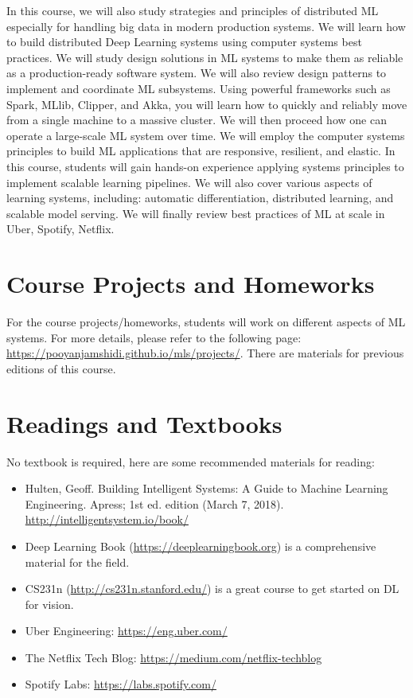 \documentclass[11pt]{article}
\begin{document}
In this course, we will also study strategies and principles of distributed ML especially for handling big data in modern production systems. We will learn how to build distributed Deep Learning systems using computer systems best practices. We will study design solutions in ML systems to make them as reliable as a production-ready software system. We will also review design patterns to implement and coordinate ML subsystems. Using powerful frameworks such as Spark, MLlib, Clipper, and Akka, you will learn how to quickly and reliably move from a single machine to a massive cluster. We will then proceed how one can operate a large-scale ML system over time. We will employ the computer systems principles to build ML applications that are responsive, resilient, and elastic. In this course, students will gain hands-on experience applying systems principles to implement scalable learning pipelines. We will also cover various aspects of learning systems, including: automatic differentiation, distributed learning, and scalable model serving. We will finally review best practices of ML at scale in Uber, Spotify, Netflix. 


\section*{Course Projects and Homeworks}

For the course projects/homeworks, students will work on different aspects of ML systems. For more details, please refer to the following page: \url{https://pooyanjamshidi.github.io/mls/projects/}. There are materials for previous editions of this course.


\section*{Readings and Textbooks}

No textbook is required, here are some recommended materials for reading:
\begin{itemize}
\item Hulten, Geoff. Building Intelligent Systems: A Guide to Machine Learning Engineering. Apress; 1st ed. edition (March 7, 2018). \url{http://intelligentsystem.io/book/}
\item Deep Learning Book (\url{https://deeplearningbook.org}) is a comprehensive material for the field.
\item CS231n (\url{http://cs231n.stanford.edu/}) is a great course to get started on DL for vision.
\item Uber Engineering: \url{https://eng.uber.com/}
\item The Netflix Tech Blog: \url{https://medium.com/netflix-techblog}
\item Spotify Labs: \url{https://labs.spotify.com/}
\end{itemize}
\end{document}
